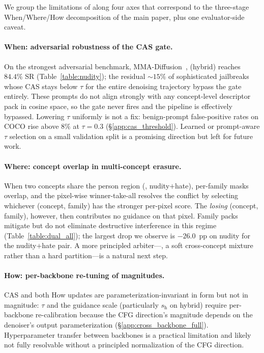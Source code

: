 We group the limitations of \ours{} along four axes that correspond to the three-stage When/Where/How decomposition of the main paper, plus one evaluator-side caveat.

\paragraph{When: adversarial robustness of the CAS gate.}
On the strongest adversarial benchmark, MMA-Diffusion~\citep{yang2024mma}, \ours{} (hybrid) reaches $84.4\%$ SR (Table~\ref{table:nudity}); the residual $\sim\!15\%$ of sophisticated jailbreaks whose CAS stays below $\tau$ for the entire denoising trajectory bypass the gate entirely. These prompts do not align strongly with any concept-level descriptor pack in cosine space, so the gate never fires and the pipeline is effectively bypassed. Lowering $\tau$ uniformly is not a fix: benign-prompt false-positive rates on COCO rise above $8\%$ at $\tau{=}0.3$ (\S\ref{app:cas_threshold}). Learned or prompt-aware $\tau$ selection on a small validation split is a promising direction but left for future work.

\paragraph{Where: concept overlap in multi-concept erasure.}
When two concepts share the person region (\eg, nudity$+$hate), per-family masks overlap, and the pixel-wise winner-take-all resolves the conflict by selecting whichever (concept, family) has the stronger per-pixel score. The \emph{losing} (concept, family), however, then contributes no guidance on that pixel. Family packs mitigate but do not eliminate destructive interference in this regime (Table~\ref{table:dual_all}); the largest drop we observe is $-26.0$~pp on nudity for the nudity$+$hate pair. A more principled arbiter---\eg, a soft cross-concept mixture rather than a hard partition---is a natural next step.

\paragraph{How: per-backbone re-tuning of magnitudes.}
CAS and both How updates are parameterization-invariant in form but not in magnitude: $\tau$ and the guidance scale (particularly $s_\text{h}$ on hybrid) require per-backbone re-calibration because the CFG direction's magnitude depends on the denoiser's output parameterization (\S\ref{app:cross_backbone_full}). Hyperparameter transfer between backbones is a practical limitation and likely not fully resolvable without a principled normalization of the CFG direction.

